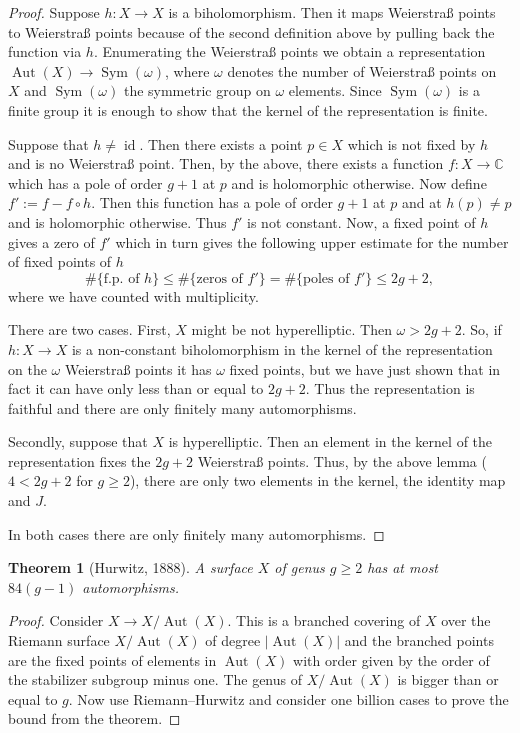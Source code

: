 \documentclass[a4paper]{article}
\newcommand{\CC}{\mathbb{C}}
\newcommand{\lra}{\longrightarrow}
\newcommand{\id}{\operatorname{id}}
\newcommand{\Aut}{\operatorname{Aut}}
\newcommand{\Sym}{\operatorname{Sym}}
\newtheorem*{thm}{Theorem}
\theoremstyle{definition}
\theoremstyle{remark}
\theoremstyle{remark}
\begin{document}
\begin{proof}
  Suppose $h:X\lra X$ is a biholomorphism. Then it maps Weierstraß points to Weierstraß points because of the second definition above by pulling back the function via $h$. Enumerating the Weierstraß points we obtain a representation $\Aut(X)\lra\Sym(\omega)$, where $\omega$ denotes the number of Weierstraß points on $X$ and $\Sym(\omega)$ the symmetric group on $\omega$ elements. Since $\Sym(\omega)$ is a finite group it is enough to show that the kernel of the representation is finite.


Suppose that $h\neq\id$. Then there exists a point $p\in X$ which is not fixed by $h$ and is no Weierstraß point. Then, by the above, there exists a function $f:X\lra\CC$ which has a pole of order $g+1$ at $p$ and is holomorphic otherwise. Now define $f':=f-f\circ h$. Then this function has a pole of order $g+1$ at $p$ and at $h(p)\neq p$ and is holomorphic otherwise. Thus $f'$ is not constant. Now, a fixed point of $h$ gives a zero of $f'$ which in turn gives the following upper estimate for the number of fixed points of $h$
\begin{equation*}
  \#\{\text{f.p. of }h\}\leq\#\{\text{zeros of }f'\}=\#\{\text{poles of }f'\} \leq 2g+2,
\end{equation*}
where we have counted with multiplicity.


There are two cases. First, $X$ might be not hyperelliptic. Then $\omega>2g+2$. So, if $h:X\lra X$ is a non-constant biholomorphism in the kernel of the representation on the $\omega$ Weierstraß points it has $\omega$ fixed points, but we have just shown that in fact it can have only less than or equal to $2g+2$. Thus the representation is faithful and there are only finitely many automorphisms.


Secondly, suppose that $X$ is hyperelliptic. Then an element in the kernel of the representation fixes the $2g+2$ Weierstraß points. Thus, by the above lemma ($4<2g+2$ for $g\geq2$), there are only two elements in the kernel, the identity map and $J$.

In both cases there are only finitely many automorphisms.
\end{proof}

\begin{thm}[Hurwitz, 1888]
  A surface $X$ of genus $g\geq2$ has at most $84(g-1)$ automorphisms.
\end{thm}

\begin{proof}
  Consider $X\lra X/\Aut(X)$. This is a branched covering of $X$ over the Riemann surface $X/\Aut(X)$ of degree $|\Aut(X)|$ and the branched points are the fixed points of elements in $\Aut(X)$ with order given by the order of the stabilizer subgroup minus one. The genus of $X/\Aut(X)$ is bigger than or equal to $g$. Now use Riemann--Hurwitz and consider one billion cases to prove the bound from the theorem.
\end{proof}
\end{document}
